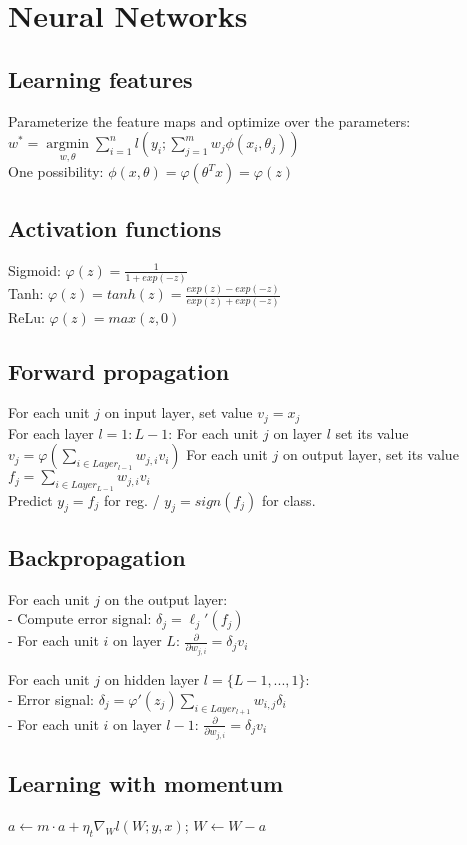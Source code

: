 \section*{Neural Networks}
\subsection*{Learning features}
Parameterize the feature maps and optimize over the parameters:\\
$w^* = \underset{w, \theta}{\operatorname{argmin}} \sum_{i=1}^n l(y_i; \sum_{j=1}^m w_j \phi(x_i, \theta_j))$\\
One possibility: $\phi(x,\theta) = \varphi(\theta^T x) = \varphi(z)$

\subsection*{Activation functions}
Sigmoid: $\varphi(z) = \frac{1}{1+exp(-z)}$\\
Tanh: $\varphi(z) = tanh(z) = \frac{exp(z)-exp(-z)}{exp(z)+exp(-z)}$\\
ReLu:  $\varphi(z) = max(z,0)$

\subsection*{Forward propagation}
For each unit $j$ on input layer, set value $v_j=x_j$\\
For each layer $l=1:L-1$: For each unit $j$ on layer $l$ set its value $v_j = \varphi(\sum_{i\in Layer_{l-1}} w_{j,i}v_i)$ For each unit $j$ on output layer, set its value $f_j = \sum_{i\in Layer_{L-1}} w_{j,i}v_i$\\
Predict $y_j = f_j$ for reg. / $y_j = sign(f_j)$ for class.

\subsection*{Backpropagation}
For each unit $j$ on the output layer:\\
- Compute error signal: $\delta_j = \ell_j'(f_j)$\\
- For each unit $i$ on layer $L$: $\frac{\partial}{\partial w_{j,i}} = \delta_j v_i$

For each unit $j$ on hidden layer $l=\{L-1,...,1\}$:\\
- Error signal: $\delta_j = \varphi'(z_j) \sum_{i\in Layer_{l+1}} w_{i,j}\delta_i$\\
- For each unit $i$ on layer $l-1$: $\frac{\partial}{\partial w_{j,i}} = \delta_j v_i$

\subsection*{Learning with momentum}
$a \leftarrow m \cdot a + \eta_t \nabla_W l(W;y,x)$; $W \leftarrow W - a$